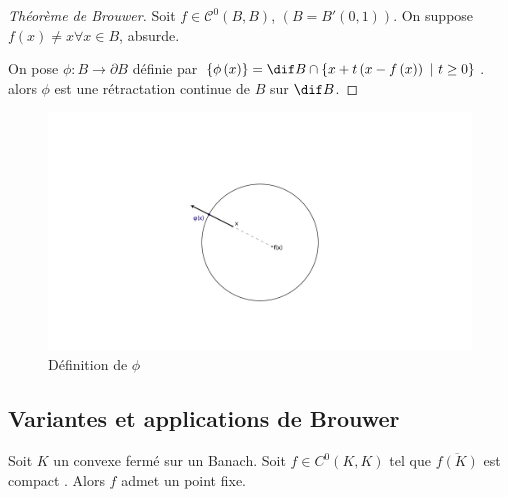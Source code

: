 \medskip

\begin{proof}[Théorème de Brouwer]

	Soit $f \in \mathcal{C}^0\left( B,B \right) $, $\left( B = B'\left( 0,1 \right)  \right) $.
	On suppose $f\left( x \right) \neq  x \forall x \in B$, absurde.

	On pose $\phi : B \to  \partial B$ définie par $\{\phi\left( x \right) \} = \dif B \cap \{x + t\left( x-f\left( x \right)  \right) ~|~ t\ge 0\} $. alors $\phi $ est une rétractation continue de $B$ sur $\dif B$.
\end{proof}

\begin{figure}[H]
	\centering
	\includegraphics[trim={30em 20em 0 30em},clip,width=1.2\textwidth]{img1.pdf}
	\caption{Définition de $\phi$}
\end{figure}


\subsection{Variantes et applications de Brouwer}


\begin{theoreme} 
	Soit $K$ un convexe fermé sur un Banach. Soit $f \in C ^0\left( K,K \right) $ tel que $\overline{f\left( K \right) }$ est compact . Alors $f$ admet un point fixe.
\end{theoreme}


